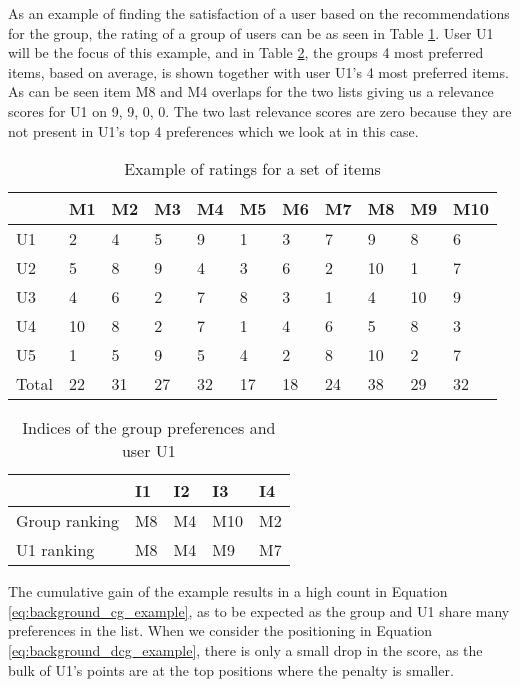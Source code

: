 As an example of finding the satisfaction of a user based on the recommendations for the group, the rating of a group of users can be as seen in Table \ref{tbl:testandeval_bordacount}. User U1 will be the focus of this example, and in Table \ref{tbl:testandeval_positions}, the groups 4 most preferred items, based on average, is shown together with user U1's 4 most preferred items. As can be seen item M8 and M4 overlaps for the two lists giving us a relevance scores for U1 on 9, 9, 0, 0. The two last relevance scores are zero because they are not present in U1's top 4 preferences which we look at in this case.

\begin{table}[H]
	\centering
	\begin{tabular}{l|l|l|l|l|l|l|l|l|l|l|}
		\cline{2-11}
		& M1 & M2 & M3 & M4 & M5 & M6 & M7 & M8 & M9 & M10 \\ \hline
		\multicolumn{1}{|l|}{U1} & 2 & 4 & 5 & 9 & 1 & 3 & 7 & 9 & 8 & 6 \\ \hline
		\multicolumn{1}{|l|}{U2} & 5 & 8 & 9 & 4 & 3 & 6 & 2 & 10 & 1 & 7 \\ \hline
		\multicolumn{1}{|l|}{U3} & 4 & 6 & 2 & 7 & 8 & 3 & 1 & 4 & 10 & 9 \\ \hline
		\multicolumn{1}{|l|}{U4} & 10 & 8 & 2 & 7 & 1 & 4 & 6 & 5 & 8 & 3 \\ \hline
		\multicolumn{1}{|l|}{U5} & 1 & 5 & 9 & 5 & 4 & 2 & 8 & 10 & 2 & 7 \\ \hline
		\multicolumn{1}{|l|}{Total} & 22 & 31 & 27 & 32 & 17 & 18 & 24 & 38 & 29 & 32 \\ \hline
	\end{tabular}
	\caption{Example of ratings for a set of items}
	\label{tbl:testandeval_bordacount}
\end{table}

\begin{table}[H]
	\centering
	\begin{tabular}{l|l|l|l|l|}
		\cline{2-5}
		& I1 & I2 & I3 & I4\\ \hline
		\multicolumn{1}{|l|}{Group ranking} & M8 & M4 & M10 & M2\\ \hline
		\multicolumn{1}{|l|}{U1 ranking} & M8 & M4 & M9 & M7\\ \hline
	\end{tabular}
	\caption{Indices of the group preferences and user U1}
	\label{tbl:testandeval_positions}
\end{table}

The cumulative gain of the example results in a high count in Equation \ref{eq:background_cg_example}, as to be expected as the group and U1 share many preferences in the list. When we consider the positioning in Equation \ref{eq:background_dcg_example}, there is only a small drop in the score, as the bulk of U1's points are at the top positions where the penalty is smaller.

